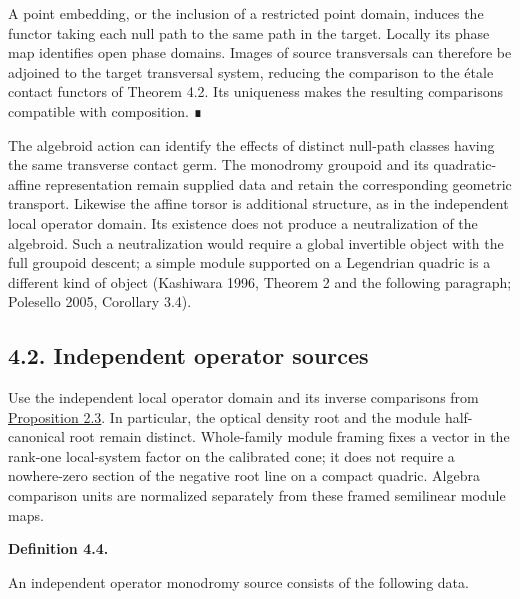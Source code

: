 \documentclass[
  english,
  11pt,
  reqno]{amsart}
\makeatletter
\newcommand{\pandocstatementheading}[1]{%
  \par\addpenalty{\@beginparpenalty}%
  \addvspace{.5\baselineskip plus .2\baselineskip minus .2\baselineskip}%
  {\normalfont\bfseries #1\par}%
  \nobreak\@afterindenttrue\@afterheading
}
\makeatother
\begin{document}
A point embedding, or the inclusion of a restricted point domain,
induces the functor taking each null path to the same path in the
target. Locally its phase map identifies open phase domains. Images of
source transversals can therefore be adjoined to the target transversal
system, reducing the comparison to the étale contact functors of Theorem
4.2. Its uniqueness makes the resulting comparisons compatible with
composition. ∎

The algebroid action can identify the effects of distinct null-path
classes having the same transverse contact germ. The monodromy groupoid
and its quadratic-affine representation remain supplied data and retain
the corresponding geometric transport. Likewise the affine torsor is
additional structure, as in the independent local operator domain. Its
existence does not produce a neutralization of the algebroid. Such a
neutralization would require a global invertible object with the full
groupoid descent; a simple module supported on a Legendrian quadric is a
different kind of object (Kashiwara 1996, Theorem 2 and the following
paragraph; Polesello 2005, Corollary 3.4).

\protect{}\label{sec:operator-independent-sources-v08}

\subsection{4.2. Independent operator
sources}\label{independent-operator-sources}

Use the independent local operator domain and its inverse comparisons
from \hyperref[prop:independent-local-operator-input]{Proposition 2.3}.
In particular, the optical density root and the module half-canonical
root remain distinct. Whole-family module framing fixes a vector in the
rank-one local-system factor on the calibrated cone; it does not require
a nowhere-zero section of the negative root line on a compact quadric.
Algebra comparison units are normalized separately from these framed
semilinear module maps.

\pandocstatementheading{\protect{}\label{def:independent-operator-monodromy-source-v092}Definition 4.4.}

An independent operator monodromy source consists of the following data.
\end{document}
